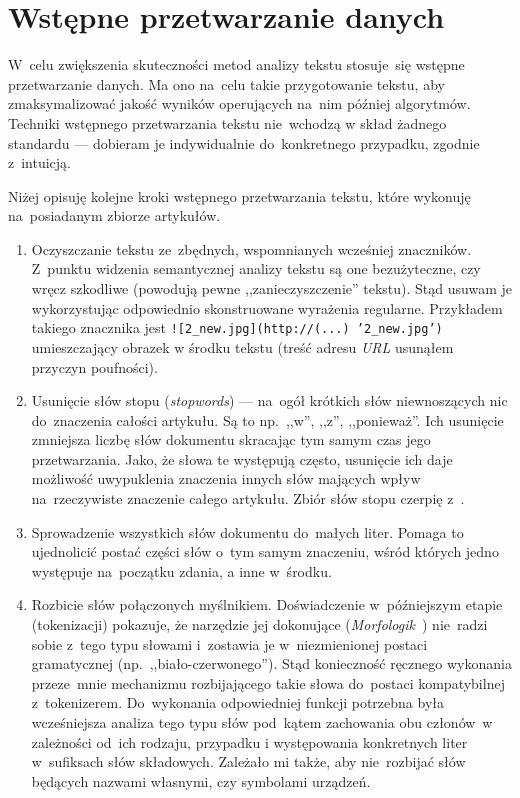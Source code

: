 \documentclass[pl]{minipw} %
\begin{document}
\section{Wstępne przetwarzanie danych}

W~celu zwiększenia skuteczności metod analizy tekstu stosuje~się wstępne przetwarzanie danych. Ma ono na~celu takie przygotowanie tekstu, aby zmaksymalizować jakość wyników operujących na~nim później algorytmów. Techniki wstępnego przetwarzania tekstu nie~wchodzą w skład żadnego standardu --- dobieram je indywidualnie do~konkretnego przypadku, zgodnie z~intuicją.

Niżej opisuję kolejne kroki wstępnego przetwarzania tekstu, które wykonuję na~posiadanym zbiorze artykułów.
\begin{enumerate}
	\item Oczyszczanie tekstu ze~zbędnych, wspomnianych wcześniej znaczników. Z~punktu widzenia semantycznej analizy tekstu są one bezużyteczne, czy wręcz szkodliwe (powodują pewne ,,zanieczyszczenie'' tekstu). Stąd usuwam je wykorzystując odpowiednio skonstruowane wyrażenia regularne. Przykładem takiego znacznika jest \texttt{![2\_new.jpg](http://(...) '2\_new.jpg')} umieszczający obrazek w środku tekstu (treść adresu \textit{URL} usunąłem przyczyn poufności).
	\item Usunięcie słów stopu (\textit{stopwords}) --- na~ogół krótkich słów niewnoszących nic do~znaczenia całości artykułu. Są to np.~,,w'', ,,z'', ,,ponieważ''. Ich usunięcie zmniejsza liczbę słów dokumentu skracając tym samym czas jego przetwarzania. Jako, że słowa te występują często, usunięcie ich daje możliwość uwypuklenia znaczenia innych słów mających wpływ na~rzeczywiste znaczenie całego artykułu. Zbiór słów stopu czerpię z~\cite{stopwords}.
\item Sprowadzenie wszystkich słów dokumentu do~małych liter. Pomaga to ujednolicić postać części słów o~tym samym znaczeniu, wśród których jedno występuje na~początku zdania, a inne w~środku.
	\item Rozbicie słów połączonych myślnikiem. Doświadczenie w~późniejszym etapie (tokenizacji) pokazuje, że narzędzie jej dokonujące (\textit{Morfologik}~\cite{morfologik}) nie~radzi sobie z~tego typu słowami  i~zostawia je w~niezmienionej postaci gramatycznej (np.~,,biało-czerwonego''). Stąd konieczność ręcznego wykonania przeze~mnie mechanizmu rozbijającego takie słowa do~postaci kompatybilnej z~tokenizerem. Do~wykonania odpowiedniej funkcji potrzebna była wcześniejsza analiza tego typu słów pod~kątem zachowania obu członów~w zależności od~ich rodzaju, przypadku i występowania konkretnych liter w~sufiksach słów składowych. Zależało mi także, aby nie~rozbijać słów będących nazwami własnymi, czy symbolami urządzeń.

\end{enumerate}
\end{document}
